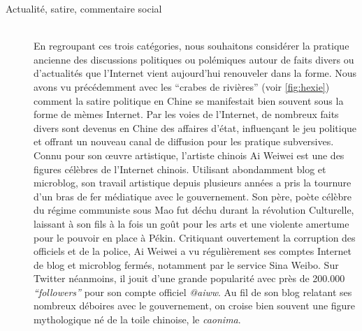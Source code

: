 \begin{description}
\item[Actualité, satire, commentaire social]
\hfill \\
En regroupant ces trois catégories, nous souhaitons considérer la pratique ancienne des discussions politiques ou polémiques autour de faits divers ou d{\textquoteright}actualités que l{\textquoteright}Internet vient aujourd{\textquoteright}hui renouveler dans la forme. Nous avons vu précédemment avec les {\textquotedblleft}crabes de rivières{\textquotedblright} (voir \ref{fig:hexie}) comment la satire politique en Chine se manifestait bien souvent sous la forme de mèmes Internet. Par les voies de l{\textquoteright}Internet, de nombreux faits divers sont devenus en Chine des affaires d{\textquoteright}état, influen\c{c}ant le jeu politique et offrant un nouveau canal de diffusion pour les pratique subversives. Connu pour son {\oe}uvre artistique, l{\textquoteright}artiste chinois Ai Weiwei est une des figures célèbres de l{\textquoteright}Internet chinois. Utilisant abondamment blog et microblog, son travail artistique depuis plusieurs années a pris la tournure d{\textquoteright}un bras de fer médiatique avec le gouvernement. Son père, poète célèbre du régime communiste sous Mao fut déchu durant la révolution Culturelle, laissant à son fils à la fois un go\^ut pour les arts et une violente amertume pour le pouvoir en place à Pékin. Critiquant ouvertement la corruption des officiels et de la police, Ai Weiwei a vu régulièrement ses comptes Internet de blog et microblog fermés, notamment par le service Sina Weibo. Sur Twitter néanmoins, il jouit d{\textquoteright}une grande popularité avec près de 200.000 \textit{{\textquotedblleft}followers{\textquotedblright}} pour son compte officiel \textit{@aiww}. Au fil de son blog relatant ses nombreux déboires avec le gouvernement, on croise bien souvent une figure mythologique né de la toile chinoise, le \textit{caonima}.  

\begin{figure}[htpb]
    \centering
    

\end{figure}
\end{description}
